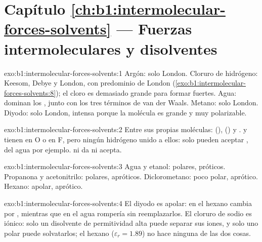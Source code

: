 \section*{Capítulo \ref{ch:b1:intermolecular-forces-solvents} --- Fuerzas intermoleculares y disolventes}

\begin{solution}{exo:b1:intermolecular-forces-solvents:1}
Argón: solo London. Cloruro de hidrógeno: Keesom, Debye y London, con
predominio de London (\cref{exo:b1:intermolecular-forces-solvents:8}); el
cloro es demasiado grande para formar  fuertes. Agua:
dominan los , junto con los tres términos de van der
Waals. Metano: solo London. Diyodo: solo London, intensa porque la
molécula es grande y muy polarizable.
\end{solution}

\begin{solution}{exo:b1:intermolecular-forces-solvents:2}
Entre sus propias moléculas:  (), 
() y .  y  tienen 
en O o en F, pero ningún hidrógeno unido a ellos: solo pueden aceptar
, del agua por ejemplo.  ni da ni acepta.
\end{solution}

\begin{solution}{exo:b1:intermolecular-forces-solvents:3}
Agua y etanol: polares, próticos. Propanona y acetonitrilo: polares,
apróticos. Diclorometano: poco polar, aprótico. Hexano: apolar, aprótico.
\end{solution}

\begin{solution}{exo:b1:intermolecular-forces-solvents:4}
El diyodo es apolar: en el hexano cambia  por
, mientras que en el agua rompería  sin reemplazarlos. El cloruro de sodio es iónico: solo un
disolvente de permitividad alta puede separar sus iones, y solo uno polar
puede solvatarlos; el hexano ($\varepsilon_r = 1.89$) no hace ninguna de
las dos cosas.
\end{solution}

